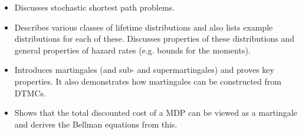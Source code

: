 \begin{itemize}
\item\citep{Bertsekas2013} Discusses stochastic shortest path problems.
\item\citep{Lai2006} Describes various classes of lifetime distributions and also lists example distributions for each of these. Discusses properties of these distributions and general properties of hazard rates (e.g. bounds for the moments).
\item\citep{Glynn2013-10} Introduces martingales (and sub- and supermartingales) and proves key properties. It also demonstrates how martingales can be constructed from DTMCs. 
\item\citep{Glynn2013-11} Shows that the total discounted cost of a MDP can be viewed as a martingale and derives the Bellman equations from this.

\end{itemize}
